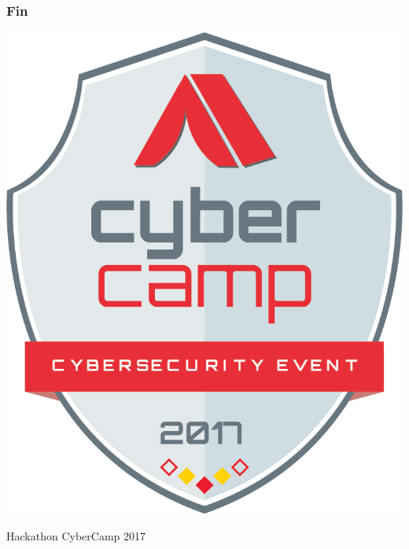 \documentclass[xcolor={dvipsnames}]{beamer}
\begin{document}
\begin{frame}\frametitle{Fin}
    \begin{center}
        \includegraphics[scale=0.3]{cybercamp} 
     \end{center}
      \begin{center}
        \huge{Hackathon CyberCamp 2017} 
     \end{center}
\end{frame}
\end{document}
